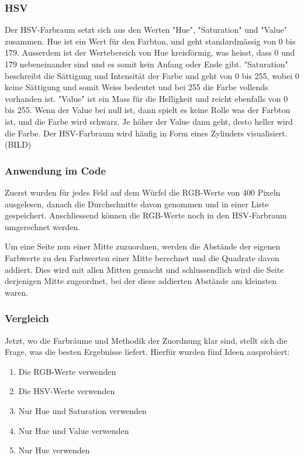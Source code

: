 \documentclass[a4paper, 12pt]{article}
\begin{document}
\subsubsection{HSV}
Der HSV-Farbraum setzt sich aus den Werten "Hue", "Saturation" und "Value" zusammen. Hue ist ein Wert für den Farbton, und geht standardmässig von 0 bis 179. Ausserdem ist der Wertebereich von Hue kreisförmig, was heisst, dass 0 und 179 nebeneinander sind und es somit kein Anfang oder Ende gibt. "Saturation" beschreibt die Sättigung und Intensität der Farbe und geht von 0 bis 255, wobei 0 keine Sättigung und somit Weiss bedeutet und bei 255 die Farbe vollends vorhanden ist. "Value" ist ein Mass für die Helligkeit und reicht ebenfalls von 0 bis 255. Wenn der Value bei null ist, dann spielt es keine Rolle was der Farbton ist, und die Farbe wird schwarz. Je höher der Value dann geht, desto heller wird die Farbe. Der HSV-Farbraum wird häufig in Form eines Zylinders visualisiert.(BILD) 
\subsubsection{Anwendung im Code}

Zuerst wurden für jedes Feld auf dem Würfel die RGB-Werte von 400 Pixeln ausgelesen, danach die Durchschnitte davon genommen und in einer Liste gespeichert. Anschliessend können die RGB-Werte noch in den HSV-Farbraum umgerechnet werden. 

Um eine Seite nun einer Mitte zuzuordnen, werden die Abstände der eigenen Farbwerte zu den Farbwerten einer Mitte berechnet und die Quadrate davon addiert. Dies wird mit allen Mitten gemacht und schlussendlich wird die Seite derjenigen Mitte zugeordnet, bei der diese addierten Abstände am kleinsten waren.
\subsubsection{Vergleich}
Jetzt, wo die Farbräume und Methodik der Zuordnung klar sind, stellt sich die Frage, was die besten Ergebnisse liefert. Hierfür wurden fünf Ideen ausprobiert:
\begin{enumerate}
  \item Die RGB-Werte verwenden
  \item Die HSV-Werte verwenden
  \item Nur Hue und Saturation verwenden
  \item Nur Hue und Value verwenden
  \item Nur Hue verwenden
\end{enumerate}
\end{document}
